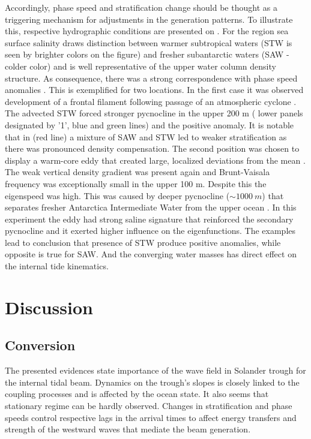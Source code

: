 \documentclass[12pt]{article}
\begin{document}
Accordingly, phase speed and stratification change should be thought as a triggering mechanism for 
adjustments in the generation patterns. To illustrate this, respective hydrographic conditions are 
presented on . For the region sea surface salinity draws distinction 
between warmer 
subtropical waters (STW is seen by brighter colors on the figure) and fresher subantarctic waters 
(SAW - colder color) and is well representative of the upper water column density structure. As 
consequence, there was a strong correspondence with phase speed anomalies 
. This is exemplified for two locations. In the 
first case it was observed development of a frontal filament following passage of an atmospheric 
cyclone . The advected STW forced stronger pycnocline in the 
upper 
200 m ( lower panels designated by '1', blue and green lines) and the 
positive anomaly. It is notable that in  (red line) a mixture of SAW and STW led to 
weaker stratification as there was pronounced density compensation. The second position was chosen 
to display a warm-core eddy that created large, localized deviations from the mean 
. The weak vertical density gradient was present again and 
Brunt-Vaisala frequency was exceptionally small in the upper 100 m. Despite this the eigenspeed was 
high. This was caused by deeper pycnocline ($\sim 1000~m$) that separates fresher Antarctica 
Intermediate Water from the upper ocean \citep{chiswell2015physical}. In this experiment the eddy 
had strong saline signature that reinforced the secondary pycnocline and it exerted higher 
influence on the eigenfunctions. The examples lead to conclusion that presence of STW produce 
positive anomalies, while opposite is true for SAW. And the converging water masses has direct 
effect on the internal tide kinematics.

\section{Discussion}
\label{C3.sec:disc}

\subsection{Conversion}
\label{C3.sec:disc_conv}
The presented evidences state importance of the wave field in Solander trough for the internal 
tidal beam. Dynamics on the trough's slopes is closely linked to the coupling processes and is 
affected by the ocean state. It also seems that stationary regime can be hardly observed. Changes 
in stratification and phase speeds control respective lags in the arrival times to affect energy 
transfers and strength of the westward waves that mediate the beam generation.\\
\end{document}
